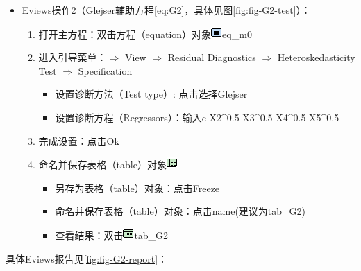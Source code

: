 \documentclass[12pt,(landscape,a4paper),(portrait,a4paper)]{article}
\providecommand{\tightlist}{%
  \setlength{\itemsep}{0pt}\setlength{\parskip}{0pt}}
\begin{document}
\begin{itemize}
\tightlist
\item
  Eviews操作2（Glejser辅助方程\eqref{eq:G2}，具体见图\ref{fig:fig-G2-test}）：

  \begin{enumerate}
  \def\labelenumi{\arabic{enumi})}
  \tightlist
  \item
    打开主方程：双击方程（equation）对象\includegraphics{picture/object/Equation.png}eq\_m0\\
  \item
    进入引导菜单：\(\Rightarrow\) View \(\Rightarrow\) Residual
    Diagnostics \(\Rightarrow\) Heteroskedasticity Test \(\Rightarrow\)
    Specification

    \begin{itemize}
    \tightlist
    \item
      设置诊断方法（Test type）: 点击选择Glejser
    \item
      设置诊断方程（Regressors）：输入c X2\^{}0.5 X3\^{}0.5 X4\^{}0.5
      X5\^{}0.5\\
    \end{itemize}
  \item
    完成设置：点击Ok\\
  \item
    命名并保存表格（table）对象\includegraphics{picture/object/Table.png}

    \begin{itemize}
    \tightlist
    \item
      另存为表格（table）对象：点击Freeze
    \item
      命名并保存表格（table）对象：点击name(建议为tab\_G2)
    \item
      查看结果：双击\includegraphics{picture/object/Table.png}tab\_G2
    \end{itemize}
  \end{enumerate}
\end{itemize}

具体Eviews报告见\ref{fig:fig-G2-report}：
\end{document}
